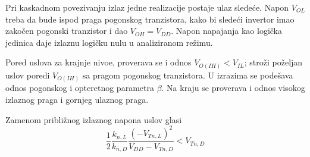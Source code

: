 Pri kaskadnom povezivanju izlaz jedne realizacije postaje ulaz sledeće. Napon $V_{OL}$ treba da bude ispod praga pogonskog tranzistora, kako bi sledeći invertor imao zakočen pogonski tranzistor i dao $V_{OH}=V_{DD}$. Napon napajanja kao logička jedinica daje izlaznu logičku nulu u analiziranom režimu.

Pored uslova za krajnje nivoe, proverava se i odnos $V_{O(IH)}<V_{IL}$; stroži poželjan uslov poredi $V_{O(IH)}$ sa pragom pogonskog tranzistora. U izrazima se podešava odnos pogonskog i opteretnog parametra $\beta$. Na kraju se proverava i odnos visokog izlaznog praga i gornjeg ulaznog praga.

Zamenom približnog izlaznog napona uslov glasi
\[\frac12\frac{k_{n,L}}{k_{n,D}}\frac{(-V_{Tn,L})^2}{V_{DD}-V_{Tn,D}}<V_{Tn,D}\]
